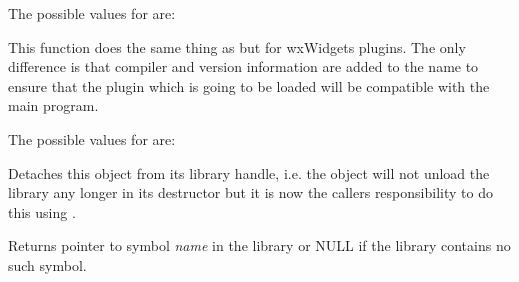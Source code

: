 The possible values for  are:

\begin{twocollist}
\end{twocollist}





\label{wxdynamiclibrarycanonicalizepluginname}


This function does the same thing as 
 but for wxWidgets
plugins. The only difference is that compiler and version information are added
to the name to ensure that the plugin which is going to be loaded will be
compatible with the main program.

The possible values for  are:

\begin{twocollist}
\end{twocollist}


\label{wxdynamiclibrarydetach}


Detaches this object from its library handle, i.e. the object will not unload
the library any longer in its destructor but it is now the callers
responsibility to do this using .


\label{wxdynamiclibrarygetsymbol}


Returns pointer to symbol {\it name} in the library or NULL if the library
contains no such symbol.




\label{wxdynamiclibrarygetsymbolaorw}

